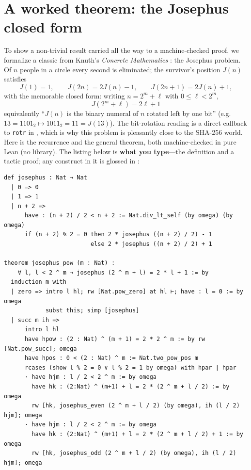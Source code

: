 \documentclass[11pt]{article}
\newcommand{\code}[1]{\lstinline[basicstyle=\ttfamily]|#1|}
\begin{document}
\section{A worked theorem: the Josephus closed form}\label{sec:josephus}
To show a non-trivial result carried all the way to a machine-checked proof, we
formalize a classic from Knuth's \emph{Concrete Mathematics}
\cite{concrete-math}: the Josephus problem. Of $n$ people in a circle every
second is eliminated; the survivor's position $J(n)$ satisfies
\[
  J(1)=1,\qquad J(2n)=2J(n)-1,\qquad J(2n+1)=2J(n)+1,
\]
with the memorable closed form: writing $n = 2^m + \ell$ with $0 \le \ell < 2^m$,
\[
  \boxed{\,J(2^m+\ell) = 2\ell+1\,}
\]
equivalently ``$J(n)$ is the binary numeral of $n$ rotated left by one bit''
(e.g.\ $13 = 1101_2 \mapsto 1011_2 = 11 = J(13)$). The bit-rotation reading is a
direct callback to \code{rotr} in , which is why this problem is
pleasantly close to the SHA-256 world. Here is the recurrence and the general
theorem, both machine-checked in pure Lean (no library). The listing below is
\textbf{what you type}---the definition and a tactic proof; any construct in it
is glossed in :

\begin{lstlisting}
def josephus : Nat → Nat
  | 0 => 0
  | 1 => 1
  | n + 2 =>
      have : (n + 2) / 2 < n + 2 := Nat.div_lt_self (by omega) (by omega)
      if (n + 2) % 2 = 0 then 2 * josephus ((n + 2) / 2) - 1
                         else 2 * josephus ((n + 2) / 2) + 1

theorem josephus_pow (m : Nat) :
    ∀ l, l < 2 ^ m → josephus (2 ^ m + l) = 2 * l + 1 := by
  induction m with
  | zero => intro l hl; rw [Nat.pow_zero] at hl ⊢; have : l = 0 := by omega
            subst this; simp [josephus]
  | succ m ih =>
      intro l hl
      have hpow : (2 : Nat) ^ (m + 1) = 2 * 2 ^ m := by rw [Nat.pow_succ]; omega
      have hpos : 0 < (2 : Nat) ^ m := Nat.two_pow_pos m
      rcases (show l % 2 = 0 ∨ l % 2 = 1 by omega) with hpar | hpar
      · have hjm : l / 2 < 2 ^ m := by omega
        have hk : (2:Nat) ^ (m+1) + l = 2 * (2 ^ m + l / 2) := by omega
        rw [hk, josephus_even (2 ^ m + l / 2) (by omega), ih (l / 2) hjm]; omega
      · have hjm : l / 2 < 2 ^ m := by omega
        have hk : (2:Nat) ^ (m+1) + l = 2 * (2 ^ m + l / 2) + 1 := by omega
        rw [hk, josephus_odd (2 ^ m + l / 2) (by omega), ih (l / 2) hjm]; omega
\end{lstlisting}
\end{document}
